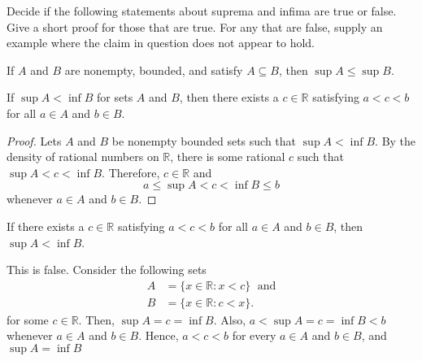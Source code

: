 \documentclass[12pt]{article}
\newcommand{\R}{\mathbb{R}}
\newenvironment{problem}[2][Problem]{\begin{trivlist}
		\item[\hskip \labelsep {\bfseries #1}\hskip \labelsep {\bfseries #2.}]}{\end{trivlist}}
\newenvironment{solution}[2][Solution]{\begin{trivlist}
		\item[\hskip \labelsep {\bfseries #1}\hskip \labelsep {\bfseries #2.}]}{\end{trivlist}}
\begin{document}
		\begin{problem}{1.3.11}
			Decide if the following statements about suprema and infima are true or false. Give a short proof for those that are true. For any that are false, supply an example where the claim in question does not appear to hold.
			\begin{enumerate}[label=(\alph*)]
				\item If $A$ and $B$ are nonempty, bounded, and satisfy $A\subseteq B$, then $\sup A \leq \sup B$.
				\item If $\sup A < \inf B$ for sets $A$ and $B$, then there exists a $c\in \R$ satisfying $a<c<b$ for all $a\in A$ and $b\in B$.
				\begin{proof}
					Lets $A$ and $B$ be nonempty bounded sets such that $\sup A<\inf B$. By the density of rational numbers on $\R$, there is some rational $c$ such that $\sup A < c < \inf B$. Therefore, $c\in \R$ and 
					\begin{equation*}
						a \leq \sup A < c < \inf B \leq b
					\end{equation*} 
				whenever $a\in A$ and $b\in B$.
				\end{proof}
				\item If there exists a $c\in \R$ satisfying $a<c<b$ for all $a\in A$ and $b\in B$, then $\sup A < \inf B$.
				\begin{solution}{(c)}
					This is false. Consider the following sets
					\begin{align*}
						A&=\{x\in \R: x<c\} \; \text{ and}\\
						B&=\{x\in \R: c<x\}.
					\end{align*} 
				for some $c\in \R$. Then, $\sup A = c = \inf B$. Also, $a<\sup A = c = \inf B<b$ whenever $a\in A$ and $b\in B$. Hence, $a<c<b$ for every $a\in A$ and $b\in B$, and $\sup A = \inf B$
				
				\end{solution}
			 
			\end{enumerate}
		\end{problem}
\end{document}
